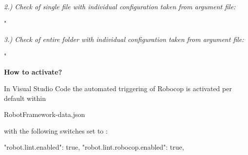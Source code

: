 \vspace{2ex}

\textit{2.) Check of single file with individual configuration taken from argument file:}

\begin{pythoncode}
"%
\end{pythoncode}

\vspace{2ex}

\textit{3.) Check of entire folder with individual configuration taken from argument file:}

\begin{pythoncode}
"%
\end{pythoncode}

\vspace{2ex}

\textbf{How to activate?}

In Visual Studio Code the automated triggering of Robocop is activated per default within

\begin{robotlog}
RobotFramework\robotvscode\data\user-data\User\settings.json
\end{robotlog}

with the following switches set to :

\begin{pythoncode}
"robot.lint.enabled": true,
"robot.lint.robocop.enabled": true,
\end{pythoncode}

